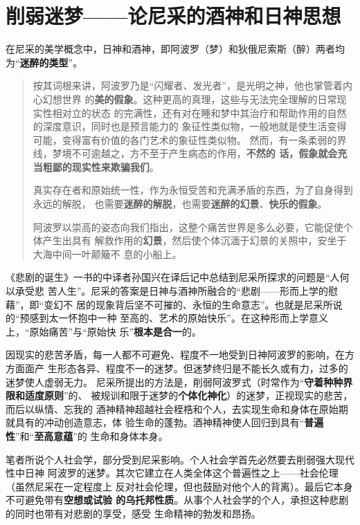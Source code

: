 \chapter{削弱迷梦------论尼采的酒神和日神思想}
\label{chap:nicai}

在尼采的美学概念中，日神和酒神，即阿波罗（梦）和狄俄尼索斯（醉）两者均
为``\textbf{迷醉的类型}''。

\begin{quotation}
  按其词根来讲，阿波罗乃是``闪耀者、发光者''，是光明之神，他也掌管着内心幻想世界
  的\textbf{美的假象}。这种更高的真理，这些与无法完全理解的日常现实性相对立的状态
  的完满性，还有对在睡和梦中其治疗和帮助作用的自然的深度意识，同时也是预言能力的
  象征性类似物，一般地就是使生活变得可能，变得富有价值的各门艺术的象征性类似物。
  然而，有一条柔弱的界线，梦境不可逾越之，方不至于产生病态的作用，\textbf{不然的
    话，假象就会充当粗鄙的现实性来欺骗我们}。

  真实存在者和原始统一性，作为永恒受苦和充满矛盾的东西，为了自身得到永远的解脱，
  也需要\textbf{迷醉的解脱}，也需要\textbf{迷醉的幻景}、\textbf{快乐的假象}。

  阿波罗以崇高的姿态向我们指出，这整个痛苦世界是多么必要，它能促使个体产生出具有
  解救作用的\textbf{幻景}，然后使个体沉湎于幻景的关照中，安坐于大海中间一叶颠簸不
  息的小船上。\cite{beijudansheng}
\end{quotation}

《悲剧的诞生》一书的中译者孙国兴在译后记中总结到尼采所探求的问题是``人何以承受悲
苦人生''。尼采的答案是日神与酒神所融合的``悲剧——形而上学的慰藉''，即``变幻不
居的现象背后坚不可摧的、永恒的生命意志''。也就是尼采所说的``预感到太一怀抱中一种
至高的、艺术的原始快乐''。在这种形而上学意义上，``原始痛苦''与``原始快
乐''\textbf{根本是合一}的。

因现实的悲苦矛盾，每一人都不可避免、程度不一地受到日神阿波罗的影响，在方方面面产
生形态各异、程度不一的迷梦。但迷梦终归是不能长久或有力，过多的迷梦使人虚弱无力。
尼采所提出的方法是，削弱阿波罗式（时常作为``\textbf{守着种种界限和适度原则}''的、
被规训和限于迷梦的\textbf{个体化神化}）的迷梦，正视现实的悲苦，而后以纵情、忘我的
酒神精神超越社会桎梏和个人，去实现生命和身体在原始期就具有的冲动创造意志，体
验生命的蓬勃。酒神精神使人回归到具有``\textbf{普遍性}''和``\textbf{至高意蕴}''的
生命和身体本身。

笔者所说个人社会学，部分受到尼采影响。个人社会学首先必然要去削弱强大现代性中日神
阿波罗的迷梦。其次它建立在人类全体这个普遍性之上——社会伦理（虽然尼采在一定程度上
反对社会伦理，但也鼓励对他个人的背离）。最后它本身不可避免带有\textbf{空想或试验
  的乌托邦性质}。从事个人社会学的个人，承担这种悲剧的同时也带有对悲剧的享受，感受
生命精神的勃发和昂扬。

